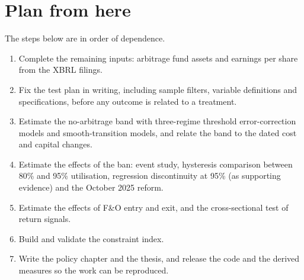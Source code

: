 \documentclass[11pt,a4paper]{article}
\begin{document}
\section{Plan from here}\label{sec:plan}
The steps below are in order of dependence.
\begin{enumerate}
\item Complete the remaining inputs: arbitrage fund assets and earnings per share from the XBRL filings.
\item Fix the test plan in writing, including sample filters, variable definitions and specifications, before any outcome is
related to a treatment.
\item Estimate the no-arbitrage band with three-regime threshold error-correction models and smooth-transition models, and
relate the band to the dated cost and capital changes.
\item Estimate the effects of the ban: event study, hysteresis comparison between 80\% and 95\% utilisation, regression
discontinuity at 95\% (as supporting evidence) and the October 2025 reform.
\item Estimate the effects of F\&O entry and exit, and the cross-sectional test of return signals.
\item Build and validate the constraint index.
\item Write the policy chapter and the thesis, and release the code and the derived measures so the work can be reproduced.
\end{enumerate}
\end{document}

